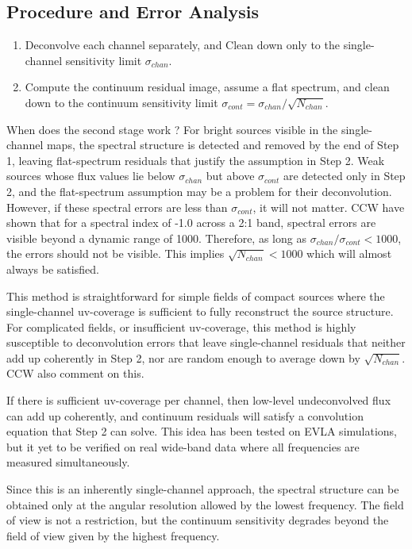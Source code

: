 \documentclass[structabstract]{aa}
\begin{document}
\subsection{Procedure and Error Analysis}
\begin{enumerate}
\item Deconvolve each channel separately, and Clean down only to the single-channel sensitivity limit
$\sigma_{chan}$. 
\item Compute the continuum residual image, 
assume a flat spectrum, and clean down to the continuum sensitivity limit 
$\sigma_{cont} = {\sigma_{chan}}/{\sqrt{N_{chan}}}$.  
\end{enumerate}
When does the second stage work ? 
For bright sources visible in the single-channel maps, the spectral structure is detected and
removed by the end of Step 1, leaving flat-spectrum residuals that justify the assumption in
Step 2. 
Weak sources whose flux values lie below $\sigma_{chan}$ but above $\sigma_{cont}$ 
are detected only in Step 2, and the flat-spectrum assumption may be a problem for their
deconvolution. However, if these spectral errors are less than $\sigma_{cont}$, it will not
matter. CCW have shown that for a spectral index of -1.0 across a 2:1 band, spectral errors
are visible beyond a dynamic range of 1000. Therefore, as long as 
$\sigma_{chan}/\sigma_{cont} < 1000$,
the errors should not be visible. This implies $\sqrt{N_{chan}} < 1000$ which will almost
always be satisfied.

This method is straightforward for simple fields of compact sources where the single-channel
uv-coverage is sufficient to fully reconstruct the source structure. 
For complicated fields, or insufficient uv-coverage, this method is highly susceptible to
deconvolution errors that leave single-channel residuals that neither add up coherently in
Step 2, nor are random enough to average down by $\sqrt{N_{chan}}$. CCW also comment on this.

If there is sufficient uv-coverage per channel, then low-level undeconvolved flux can add up
coherently, and continuum residuals will satisfy a convolution equation that Step 2 can solve.
This idea has been tested on EVLA simulations, but it yet to be verified on real wide-band data
where all frequencies are measured simultaneously.

Since this is an inherently single-channel approach, the spectral structure can be obtained only
at the angular resolution allowed by the lowest frequency. The field of view is not a restriction,
but the continuum sensitivity degrades beyond the field of view given by the highest frequency.
\end{document}
